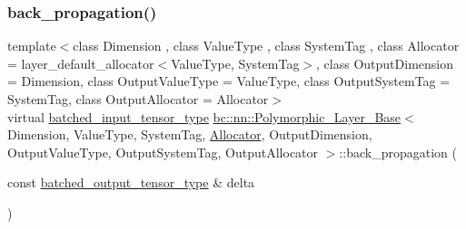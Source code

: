 \subsubsection{\texorpdfstring{back\+\_\+propagation()}{back\_propagation()}\hspace{0.1cm}{\footnotesize\ttfamily [1/2]}}
{\footnotesize\ttfamily template$<$class Dimension , class Value\+Type , class System\+Tag , class Allocator  = layer\+\_\+default\+\_\+allocator$<$\+Value\+Type, System\+Tag$>$, class Output\+Dimension  = Dimension, class Output\+Value\+Type  = Value\+Type, class Output\+System\+Tag  = System\+Tag, class Output\+Allocator  = Allocator$>$ \\
virtual \hyperlink{structbc_1_1nn_1_1Polymorphic__Layer__Base_ae694b03dd73923ff973b0d2c9156e161}{batched\+\_\+input\+\_\+tensor\+\_\+type} \hyperlink{structbc_1_1nn_1_1Polymorphic__Layer__Base}{bc\+::nn\+::\+Polymorphic\+\_\+\+Layer\+\_\+\+Base}$<$ Dimension, Value\+Type, System\+Tag, \hyperlink{classbc_1_1allocators_1_1Allocator}{Allocator}, Output\+Dimension, Output\+Value\+Type, Output\+System\+Tag, Output\+Allocator $>$\+::back\+\_\+propagation (\begin{DoxyParamCaption}\item[{const \hyperlink{structbc_1_1nn_1_1Polymorphic__Layer__Base_a45ed57549be9c4e5c40c52168ca15ae9}{batched\+\_\+output\+\_\+tensor\+\_\+type} \&}]{delta }\end{DoxyParamCaption})\hspace{0.3cm}{\ttfamily [pure virtual]}}

\mbox{\label{structbc_1_1nn_1_1Polymorphic__Layer__Base_ae68fb249544a51c79be7aca6fb4a0727}} 
